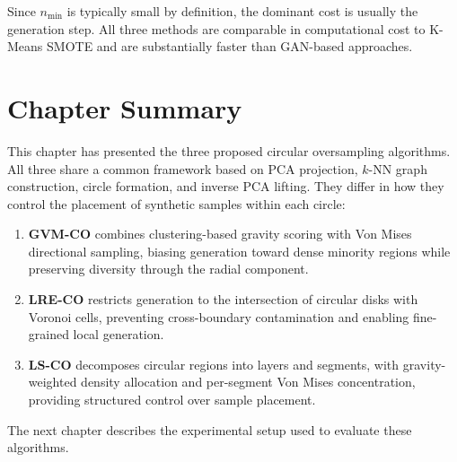 Since $n_{\min}$ is typically small by definition, the dominant cost is usually the generation step.
All three methods are comparable in computational cost to K-Means SMOTE and are substantially faster than GAN-based approaches.


\section{Chapter Summary}
\label{sec:methods:summary}

This chapter has presented the three proposed circular oversampling algorithms.
All three share a common framework based on PCA projection, $k$-NN graph construction, circle formation, and inverse PCA lifting.
They differ in how they control the placement of synthetic samples within each circle:

\begin{enumerate}[leftmargin=*]
    \item \textbf{GVM-CO} combines clustering-based gravity scoring with Von Mises directional sampling, biasing generation toward dense minority regions while preserving diversity through the radial component.
    \item \textbf{LRE-CO} restricts generation to the intersection of circular disks with Voronoi cells, preventing cross-boundary contamination and enabling fine-grained local generation.
    \item \textbf{LS-CO} decomposes circular regions into layers and segments, with gravity-weighted density allocation and per-segment Von Mises concentration, providing structured control over sample placement.
\end{enumerate}

The next chapter describes the experimental setup used to evaluate these algorithms.
